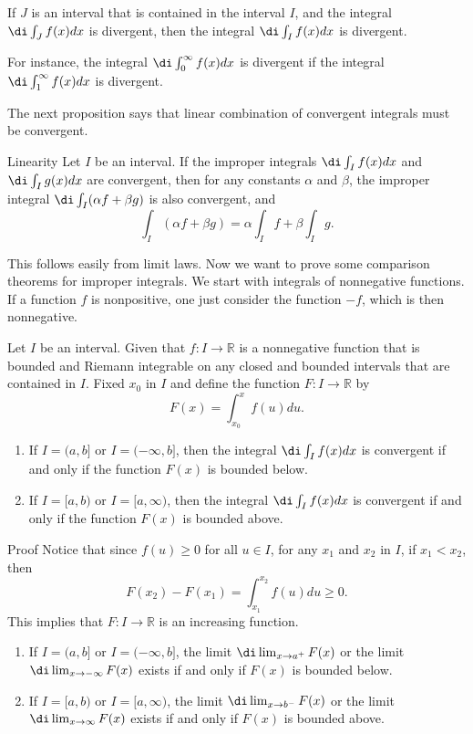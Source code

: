 \begin{example}[label=20230527]{}
\begin{highlight}
{}If $J$ is an interval that is contained in the interval $I$, and the integral $\di\int_J f(x)dx$ is divergent, then the integral $\di\int_I f(x)dx$ is divergent. 
\end{highlight}
For instance, the integral $\di\int_0^{\infty}f(x)dx$ is divergent  if  the integral $\di\int_1^{\infty}f(x)dx$ is divergent.

The next proposition says that linear combination  of convergent integrals must be convergent.
\begin{proposition}{Linearity}
Let $I$ be an interval. If the improper integrals $\di\int_If(x)dx$ and $\di\int_Ig(x)dx$ are convergent, then for any constants $\alpha$ and $\beta$, the improper integral $\di\int_I(\alpha f+\beta g)$ is also convergent, and
\[\int_I(\alpha f+\beta g)=\alpha\int_If+\beta\int_I g.\]
\end{proposition}This follows easily from limit laws.
Now we want to prove some comparison theorems for improper integrals. We start with integrals of nonnegative functions. If a function $f $ is nonpositive, one just consider the function $-f$, which is then nonnegative. 
 
\begin{lemma}[label=230224_5]{} Let $I$ be an interval. Given that $f:I\to\mathbb{R}$  is a nonnegative function that is bounded and Riemann integrable on any closed and bounded intervals that are contained in $I$. Fixed $x_0$ in $I$ and define the function $F:I\to\mathbb{R}$ by
\[F(x)=\int_{x_0}^xf(u)du.\]
\begin{enumerate}[1.]
\item If $I=(a, b]$ or $I=(-\infty,b]$, then the integral $\di\int_I f(x)dx$ is convergent if and only if the function $F(x)$ is bounded below. 
\item If $I=[a,b)$ or $I=[a,\infty)$, then the integral $\di\int_If(x)dx$ is convergent if and only if the function $F(x)$ is bounded above. 
 \end{enumerate}
\end{lemma}

\begin{myproof}{Proof}
Notice that since $f(u)\geq 0$ for all $u\in I$, for any $x_1$ and $x_2$ in $I$, if $x_1<x_2$, then 
\[F(x_2)-F(x_1)=\int_{x_1}^{x_2}f(u)du\geq 0.\]
This implies that $F:I\to\mathbb{R}$ is an increasing function. \begin{enumerate}[1.]
\item If $I=(a,b]$ or $I=(-\infty, b]$, the limit $\di\lim_{x\to a^+}F(x)$ or the limit $\di\lim_{x\to-\infty}F(x)$ exists if and only if $F(x)$ is bounded below. \item If $I=[a, b)$ or $I=[a, \infty)$, the  limit $\di\lim_{x\to b^-}F(x)$ or the limit $\di\lim_{x\to \infty}F(x)$ exists if and only if $F(x)$ is bounded above. \end{enumerate}
\end{myproof}


\end{example}
